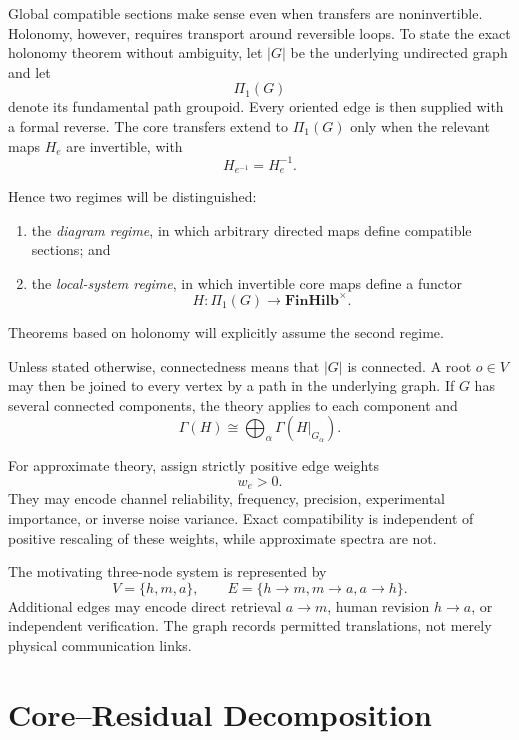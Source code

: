 
Global compatible sections make sense even when transfers are noninvertible.
Holonomy, however, requires transport around reversible loops. To state the
exact holonomy theorem without ambiguity, let \(|G|\) be the underlying
undirected graph and let
\[
\Pi_1(G)
\]
denote its fundamental path groupoid. Every oriented edge is then supplied
with a formal reverse. The core transfers extend to \(\Pi_1(G)\) only when
the relevant maps \(H_e\) are invertible, with
\[
H_{e^{-1}}=H_e^{-1}.
\]

Hence two regimes will be distinguished:
\begin{enumerate}
\item the \emph{diagram regime}, in which arbitrary directed maps define
compatible sections; and
\item the \emph{local-system regime}, in which invertible core maps define a
functor
\[
H:\Pi_1(G)\to\mathbf{FinHilb}^{\times}.
\]
\end{enumerate}
Theorems based on holonomy will explicitly assume the second regime.


Unless stated otherwise, connectedness means that \(|G|\) is connected. A
root \(o\in V\) may then be joined to every vertex by a path in the underlying
graph. If \(G\) has several connected components, the theory applies to each
component and
\[
\Gamma(H)
\cong
\bigoplus_{\alpha}\Gamma(H|_{G_\alpha}).
\]


For approximate theory, assign strictly positive edge weights
\[
w_e>0.
\]
They may encode channel reliability, frequency, precision, experimental
importance, or inverse noise variance. Exact compatibility is independent of
positive rescaling of these weights, while approximate spectra are not.

\begin{SRWTexample}\label{SRWT:ex:hma-graph}
The motivating three-node system is represented by
\[
V=\{h,m,a\},
\qquad
E=\{h\to m,m\to a,a\to h\}.
\]
Additional edges may encode direct retrieval \(a\to m\), human revision
\(h\to a\), or independent verification. The graph records permitted
translations, not merely physical communication links.
\end{SRWTexample}

\section{Core--Residual Decomposition}

